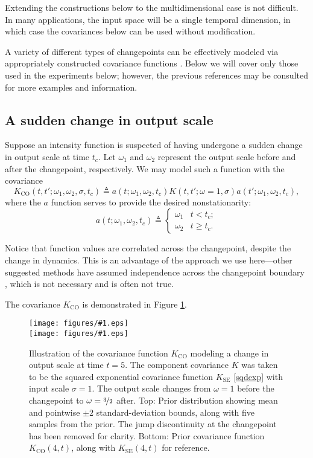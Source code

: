 \documentclass{article}
\newcommand{\deq}{\triangleq}
\newcommand{\psff}[1]{\texttt{[image: figures/\#1.eps]}}
\begin{document}
Extending the constructions below to the multidimensional case is not
difficult.  In many applications, the input space will be a single
temporal dimension, in which case the covariances below can be used
without modification.

A variety of different types of changepoints can be effectively
modeled via appropriately constructed covariance functions
\citep{cpcj, thesis}.  Below we will cover only those used in the
experiments below; however, the previous references may be consulted
for more examples and information.

\subsection{A sudden change in output scale}

Suppose an intensity function is suspected of having undergone a
sudden change in output scale at time $t_c$.  Let $\omega_1$ and
$\omega_2$ represent the output scale before and after the changepoint,
respectively.  We may model such a function with the covariance
\begin{equation*}
  K_{\text{CO}}(t, t'; \omega_1, \omega_2, \sigma, t_c)
  \deq 
  a(t; \omega_1, \omega_2, t_c)
  K(t, t'; \omega = 1, \sigma)
  a(t'; \omega_1, \omega_2, t_c),
\end{equation*}
where the $a$ function serves to provide the desired nonstationarity:
\begin{equation}
  \label{outchange}
  a(t; \omega_1, \omega_2, t_c) 
  \deq
  \begin{cases}
    \omega_1 & t < t_c; \\
    \omega_2 & t \geq t_c.
  \end{cases}
\end{equation}

Notice that function values are correlated across the changepoint,
despite the change in dynamics.  This is an advantage of the approach
we use here---other suggested methods have assumed independence
across the changepoint boundary \citep{adamscp, bocpd}, which is not
necessary and is often not true.

The covariance $K_{\text{CO}}$ is demonstrated in Figure
\ref{fig:changeoutput}.

\begin{figure}
  \centering
  \psff{changepointcovsamples3} \\
  \bigskip
  \psff{changepointcov3}\medskip
  \caption{Illustration of the covariance function $K_{\text{CO}}$
    modeling a change in output scale at time $t = \text{5}$.  The
    component covariance $K$ was taken to be the squared exponential
    covariance function $K_{\text{SE}}$ \eqref{sqdexp} with input
    scale $\sigma = {1}$.  The output scale changes from $\omega
    = {1}$ before the changepoint to $\omega = \nicefrac{3}{2}$
    after. Top: Prior distribution showing mean and pointwise $\pm
    {2}$ standard-deviation bounds, along with five samples from
    the prior.  The jump discontinuity at the changepoint has been
    removed for clarity.  Bottom: Prior covariance function
    $K_{\text{CO}}(4, t)$, along with $K_{\text{SE}}(4, t)$ for
    reference.  }
  \label{fig:changeoutput}
\end{figure}
\end{document}
